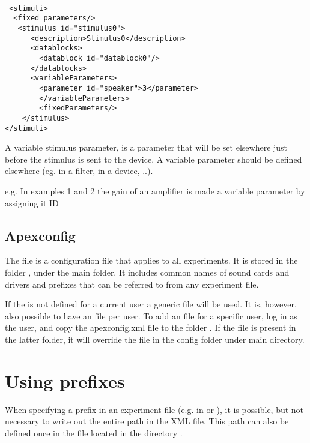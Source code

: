 \begin{lstlisting}

 <stimuli>
  <fixed_parameters/>
   <stimulus id="stimulus0">
      <description>Stimulus0</description>
      <datablocks>
        <datablock id="datablock0"/>
      </datablocks>
      <variableParameters>
        <parameter id="speaker">3</parameter>
        </variableParameters>
        <fixedParameters/>
    </stimulus>
</stimuli>

\end{lstlisting}


\label{sec:Parameters}

A variable stimulus parameter, is a parameter that will be set
elsewhere just before the stimulus is sent to the device. A
variable parameter should be defined elsewhere (eg. in a filter,
in a device, ..).

e.g. In examples 1 and 2 the gain of an amplifier is made a
variable parameter by assigning it ID 


\subsection{Apexconfig}
\label{apexconfig}


The  file is a configuration file that
applies to all experiments. It is stored in the folder
, under the main \apex folder. It includes common
names of sound cards and drivers and prefixes that can be referred
to from any experiment file.

If the  is not defined for a current user
a generic file will be used. It is, however, also possible to have
an  file per user. To add an
 file for a specific user, log in as the
user, and copy the apexconfig.xml file to the folder
. If the file
 is present in the latter folder, it will
override the  file in the config folder
under main \apex directory.


\section{Using prefixes}

When specifying a prefix in an experiment file (e.g. in
 or ), it is possible, but
not necessary to write out the entire path in the XML file. This
path can also be defined once in the 
file located in the directory .

